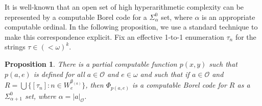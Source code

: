 \documentclass{amsart}
\newtheorem{prop}[thm]{Proposition}
\theoremstyle{definition}
\theoremstyle{remark}
\newcommand{\kO}{\mathcal{O}}
\begin{document}
It is well-known that an open set of high hyperarithmetic complexity 
can be represented by a computable Borel code 
for a $\Sigma^0_\alpha$ set, where $\alpha$ is an appropriate
computable ordinal.  In the following proposition, we use a 
standard technique to make this correspondence explicit.  
Fix an effective 1-to-1 enumeration $\tau_n$ for the 
strings $\tau \in (<\omega)^k$. 

\begin{prop}
\label{prop:Borelcodes} 
There is a partial computable function $p(x,y)$ such that $p(a,e)$ is
defined for all $a \in \mathcal{O}$ and $e \in \omega$ and such
that if $a \in \mathcal{O}$ and 
$R = \bigcup \{ [\tau_n] : n \in W_e^{\emptyset_{(a)}} \}$, then
$\Phi_{p(a,e)}$ is a computable Borel code for $R$ as a
$\Sigma^0_{\alpha+1}$ set, where $\alpha=|a|_\kO$.
\end{prop}
\end{document}
